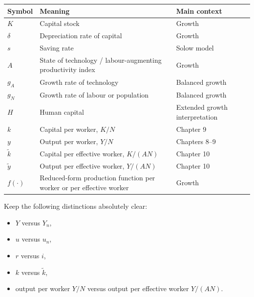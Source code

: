\documentclass[12pt]{article}
\begin{document}
\begin{center}
\renewcommand{\arraystretch}{1.2}
\begin{tabular}{|p{2.0cm}|p{8.0cm}|p{4.8cm}|}
\hline
\textbf{Symbol} & \textbf{Meaning} & \textbf{Main context} \\
\hline
\(K\) & Capital stock & Growth \\
\hline
\(\delta\) & Depreciation rate of capital & Growth \\
\hline
\(s\) & Saving rate & Solow model \\
\hline
\(A\) & State of technology / labour-augmenting productivity index & Growth \\
\hline
\(g_A\) & Growth rate of technology & Balanced growth \\
\hline
\(g_N\) & Growth rate of labour or population & Balanced growth \\
\hline
\(H\) & Human capital & Extended growth interpretation \\
\hline
\(k\) & Capital per worker, \(K/N\) & Chapter 9 \\
\hline
\(y\) & Output per worker, \(Y/N\) & Chapters 8--9 \\
\hline
\(\tilde{k}\) & Capital per effective worker, \(K/(AN)\) & Chapter 10 \\
\hline
\(\tilde{y}\) & Output per effective worker, \(Y/(AN)\) & Chapter 10 \\
\hline
\(f(\cdot)\) & Reduced-form production function per worker or per effective worker & Growth \\
\hline
\end{tabular}
\end{center}

\begin{examtip}[title={Exam Focus: Symbols most often confused}]
Keep the following distinctions absolutely clear:
\begin{itemize}[leftmargin=1.5em]
\item \(Y\) versus \(Y_n\),
\item \(u\) versus \(u_n\),
\item \(r\) versus \(i\),
\item \(k\) versus \(\tilde{k}\),
\item output per worker \(Y/N\) versus output per effective worker \(Y/(AN)\).
\end{itemize}
\end{examtip}

\newpage
\end{document}
